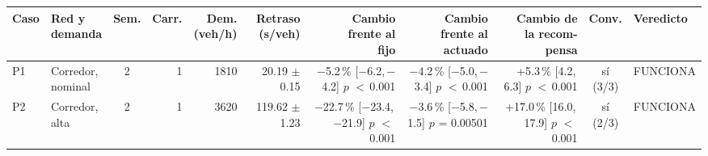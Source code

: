 \begin{table}[H]
\centering
\scriptsize
\setlength{\tabcolsep}{1.5pt}
\begin{tabular}{llcrrrrrrcl}
\toprule
Caso & \makecell[l]{Red y\\demanda} & Sem. & Carr. & \makecell{Dem.\\(veh/h)} & \makecell{Retraso\\(s/veh)} & \makecell{Cambio\\frente al\\fijo} & \makecell{Cambio\\frente al\\actuado} & \makecell{Cambio de\\la recom-\\pensa} & Conv. & Veredicto \\
\midrule
P1 & \makecell[l]{Corredor,\\{}nominal} & 2 & 1 & 1810 & \makecell[r]{20.19\\{}$\pm$ 0.15} & \makecell[r]{$-$5.2\,\%\\{}[$-$6.2,\,$-$4.2]\\$p$ $<$\,0.001} & \makecell[r]{$-$4.2\,\%\\{}[$-$5.0,\,$-$3.4]\\$p$ $<$\,0.001} & \makecell[r]{+5.3\,\%\\{}[4.2,\,6.3]\\$p$ $<$\,0.001} & \makecell[c]{sí\\{}(3/3)} & FUNCIONA \\
P2 & \makecell[l]{Corredor,\\{}alta} & 2 & 1 & 3620 & \makecell[r]{119.62\\{}$\pm$ 1.23} & \makecell[r]{$-$22.7\,\%\\{}[$-$23.4,\,$-$21.9]\\$p$ $<$\,0.001} & \makecell[r]{$-$3.6\,\%\\{}[$-$5.8,\,$-$1.5]\\$p$ = 0.00501} & \makecell[r]{+17.0\,\%\\{}[16.0,\,17.9]\\$p$ $<$\,0.001} & \makecell[c]{sí\\{}(2/3)} & FUNCIONA \\

\end{tabular}
\end{table}
